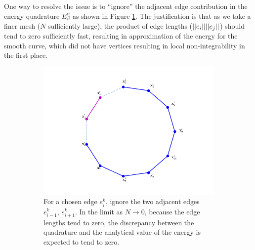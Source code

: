 \documentclass[../dissertation.tex]{subfiles}
\begin{document}
One way to resolve the issue is to ``ignore'' the adjacent edge contribution\cite{YSC2021} in the energy quadrature $E_{\beta}^{\alpha}$ as shown in Figure \ref{fig: Energy discretization by ignoring adjacent edges}.
The justification is that as we take a finer mesh ($N$ sufficiently large), the product of edge lengths ($\lvert \lvert e_i \rvert \rvert\lvert \lvert e_j \rvert \rvert$) should tend to zero sufficiently fast, resulting in approximation of the energy for the smooth curve, which did not have vertices resulting in local non-integrability in the first place.
\begin{figure}[tbp]
    \centering
    \begin{subfigure}[b]{0.75\textwidth}
        \centering
        \includegraphics[width=\textwidth]{sections/unknottingCurveImgs/energyDiscretization1}
        \caption{For a chosen edge $e_i^k$, ignore the two adjacent edges $e_{i-1}^k$, $e_{i+1}^k$.
            In the limit as $N \rightarrow 0$, because the edge lengths tend to zero,
            the discrepancy between the quadrature and the analytical value of the energy is expected to tend to zero.
                }
        \label{fig: Energy discretization by ignoring adjacent edges}
    \end{subfigure}
    \par\bigskip
    \begin{subfigure}[b]{0.75\textwidth}
        \centering

\end{subfigure}
\end{figure}
\end{document}
